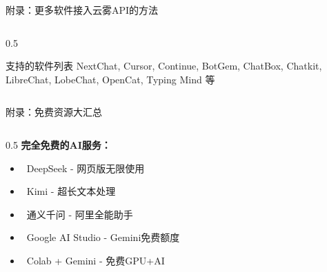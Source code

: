 \documentclass[aspectratio=169,11pt]{beamer}
\begin{document}
\begin{frame}[fragile]{附录：更多软件接入云雾API的方法}
\begin{columns}
\begin{column}{0.5\textwidth}
            \vspace{0.2cm}
            \begin{alertblock}{支持的软件列表}
                \small
                NextChat, Cursor, Continue, BotGem, ChatBox, Chatkit, LibreChat, LobeChat, OpenCat, Typing Mind 等
            \end{alertblock}
        \end{column}
    \end{columns}
\end{frame}

\begin{frame}{附录：免费资源大汇总}
    \begin{columns}
        \begin{column}{0.5\textwidth}
            \textbf{完全免费的AI服务：}
            \begin{itemize}
                \item \textcolor{green!60!black}{\faStar\ DeepSeek} - 网页版无限使用
                \item \textcolor{green!60!black}{\faStar\ Kimi} - 超长文本处理
                \item \textcolor{green!60!black}{\faStar\ 通义千问} - 阿里全能助手
                \item \textcolor{green!60!black}{\faStar\ Google AI Studio} - Gemini免费额度
                \item \textcolor{green!60!black}{\faStar\ Colab + Gemini} - 免费GPU+AI
            \end{itemize}
            

\end{column}
\end{columns}
\end{frame}
\end{document}
